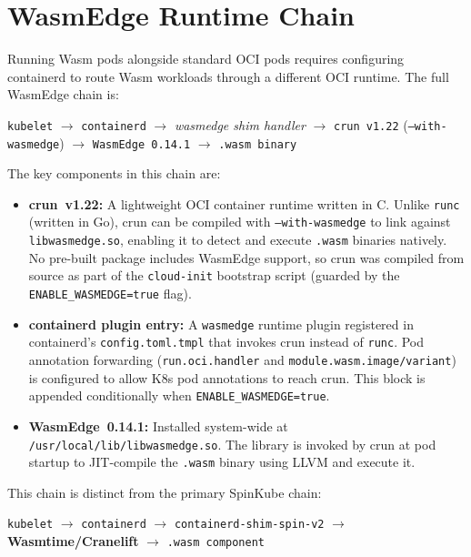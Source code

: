 \section{WasmEdge Runtime Chain}
\label{app:wasmedge_chain}

Running \acs{Wasm} pods alongside standard \acs{OCI} pods requires configuring containerd to route \acs{Wasm} workloads through a different \acs{OCI} runtime. The full \acs{WasmEdge} chain is:

\begin{center}
\texttt{kubelet} $\to$ \texttt{containerd} $\to$ \textit{wasmedge shim handler} $\to$ \texttt{crun~v1.22} (\texttt{--with-wasmedge}) $\to$ \texttt{WasmEdge~0.14.1} $\to$ \texttt{.wasm binary}
\end{center}

The key components in this chain are:

\begin{itemize}
    \item \textbf{crun~v1.22:} A lightweight \acs{OCI} container runtime written in C. Unlike \texttt{runc} (written in Go), crun can be compiled with \texttt{--with-wasmedge} to link against \texttt{libwasmedge.so}, enabling it to detect and execute \texttt{.wasm} binaries natively. No pre-built package includes \acs{WasmEdge} support, so crun was compiled from source as part of the \texttt{cloud-init} bootstrap script (guarded by the \texttt{ENABLE\_WASMEDGE=true} flag).
    \item \textbf{containerd plugin entry:} A \texttt{wasmedge} runtime plugin registered in containerd's \texttt{config.toml.tmpl} that invokes crun instead of \texttt{runc}. Pod annotation forwarding (\texttt{run.oci.handler} and \texttt{module.wasm.image/variant}) is configured to allow \acs{K8s} pod annotations to reach crun. This block is appended conditionally when \texttt{ENABLE\_WASMEDGE=true}.
    \item \textbf{WasmEdge~0.14.1:} Installed system-wide at \texttt{/usr/local/lib/libwasmedge.so}. The library is invoked by crun at pod startup to \acs{JIT}-compile the \texttt{.wasm} binary using \acs{LLVM} and execute it.
\end{itemize}

This chain is distinct from the primary SpinKube chain:
\begin{center}
\texttt{kubelet} $\to$ \texttt{containerd} $\to$ \texttt{containerd-shim-spin-v2} $\to$ \textbf{Wasmtime/Cranelift} $\to$ \texttt{.wasm component}
\end{center}

